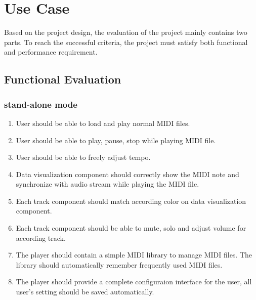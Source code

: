 
\chapter{Use Case} %



\ifpdf
    \graphicspath{{X/figures/PNG/}{X/figures/PDF/}{X/figures/}}
\else
    \graphicspath{{X/figures/EPS/}{X/figures/}}
\fi



Based on the project design, the evaluation of the project mainly contains two parts. To reach the
successful criteria, the project must satisfy both functional and performance requirement.

\section{Functional Evaluation}
\subsection{stand-alone mode}
\begin{enumerate}
  \item User should be able to load and play normal MIDI files.
  \item User should be able to play, pause, stop while playing MIDI file.  
  \item User should be able to freely adjust tempo.  
  \item Data visualization component should correctly show the MIDI note 
        and synchronize with audio stream while playing the MIDI file.
  \item Each track component should match according color on data visualization component.
  \item Each track component should be able to mute, solo and adjust 
        volume for according track.  
  \item The player should contain a simple MIDI library to manage MIDI files. 
        The library should automatically remember frequently used MIDI files.
  \item The player should provide a complete configuraion interface for the 
        user, all user's setting should be saved automatically.
\end{enumerate}

